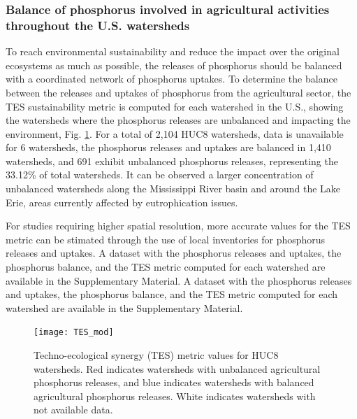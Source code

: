 \documentclass[10pt,a4paper]{article}
\begin{document}
\subsubsection{Balance of phosphorus involved in agricultural activities throughout the U.S. watersheds}
To reach environmental sustainability and reduce the impact over the original ecosystems as much as possible, the releases of phosphorus should be balanced with a coordinated network of phosphorus uptakes. To determine the balance between the releases and uptakes of phosphorus from the agricultural sector, the TES sustainability metric is computed for each watershed in the U.S., showing the watersheds where the phosphorus releases are unbalanced and impacting the environment, Fig. \ref{fig:TES}. For a total of 2,104 HUC8 watersheds, data is unavailable for 6 watersheds, the phosphorus releases and uptakes are balanced in 1,410 watersheds, and 691 exhibit unbalanced phosphorus releases, representing the 33.12\% of total watersheds. It can be observed a larger concentration of unbalanced watersheds along the Mississippi River basin and around the Lake Erie, areas currently affected by eutrophication issues. 

For studies requiring higher spatial resolution, more accurate values for the TES metric can be stimated through the use of local inventories for phosphorus releases and uptakes. A dataset with the phosphorus releases and uptakes, the phosphorus balance, and the TES metric computed for each watershed are available in the Supplementary Material. A dataset with the phosphorus releases and uptakes, the phosphorus balance, and the TES metric computed for each watershed are available in the Supplementary Material.

\begin{figure}[] 
	\begin{adjustwidth}{}{}
		\centering
		\texttt{[image: TES\_mod]} 
		\caption{Techno-ecological synergy (TES) metric values for HUC8 watersheds. Red indicates watersheds with unbalanced agricultural phosphorus releases, and blue indicates watersheds with balanced agricultural phosphorus releases. White indicates watersheds with not available data.} 
		\label{fig:TES}
	\end{adjustwidth}{}
\end{figure}
\end{document}
